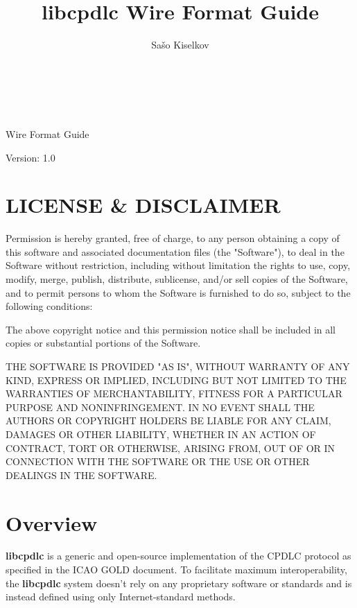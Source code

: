 \documentclass[a4paper,12pt]{article}
\title{libcpdlc Wire Format Guide}
\author{Sa\v so Kiselkov}
\newcommand{\libcpdlc}{\textbf{libcpdlc}\xspace}
\begin{document}
\thispagestyle{empty}

\vspace*{25em}
\begin{center}
\\
\strut\\
{\Large Wire Format Guide}
\end{center}
\vspace{21em}
Version: 1.0

\newpage

\tableofcontents

\newpage

\thispagestyle{empty}

\section{LICENSE \& DISCLAIMER}

Permission is hereby granted, free of charge, to any person obtaining a
copy of this software and associated documentation files (the
"Software"), to deal in the Software without restriction, including
without limitation the rights to use, copy, modify, merge, publish,
distribute, sublicense, and/or sell copies of the Software, and to permit
persons to whom the Software is furnished to do so, subject to the
following conditions:

\strut

\noindent The above copyright notice and this permission notice shall be
included in all copies or substantial portions of the Software.

\strut

\noindent THE SOFTWARE IS PROVIDED "AS IS", WITHOUT WARRANTY OF ANY KIND,
EXPRESS OR IMPLIED, INCLUDING BUT NOT LIMITED TO THE WARRANTIES OF
MERCHANTABILITY, FITNESS FOR A PARTICULAR PURPOSE AND NONINFRINGEMENT. IN
NO EVENT SHALL THE AUTHORS OR COPYRIGHT HOLDERS BE LIABLE FOR ANY CLAIM,
DAMAGES OR OTHER LIABILITY, WHETHER IN AN ACTION OF CONTRACT, TORT OR
OTHERWISE, ARISING FROM, OUT OF OR IN CONNECTION WITH THE SOFTWARE OR THE
USE OR OTHER DEALINGS IN THE SOFTWARE.

\newpage

\section{Overview}

\noindent\libcpdlc is a generic and open-source implementation of the
CPDLC protocol as specified in the ICAO GOLD document. To facilitate
maximum interoperability, the \libcpdlc system doesn't rely on any
proprietary software or standards and is instead defined using only
Internet-standard methods.
\end{document}
